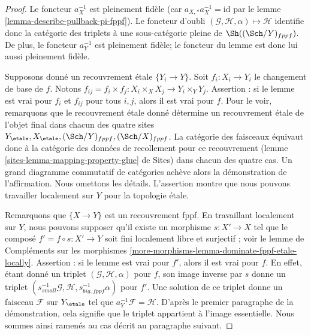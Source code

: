 \begin{proof}
Le foncteur $a_X^{-1}$ est pleinement fidèle (car $a_{X, *}a_X^{-1} = \text{id}$ par le
lemme \ref{lemma-describe-pullback-pi-fppf}). Le foncteur d'oubli
$(\mathcal{G}, \mathcal{H}, \alpha) \mapsto \mathcal{H}$ identifie donc la
catégorie des triplets à une sous-catégorie pleine de $\Sh((\Sch/Y)_{fppf})$.
De plus, le foncteur $a_Y^{-1}$ est pleinement fidèle; le foncteur
du lemme est donc lui aussi pleinement fidèle.

\medskip\noindent
Supposons donné un recouvrement étale $\{Y_i \to Y\}$.
Soit $f_i : X_i \to Y_i$ le changement de base de $f$.
Notons $f_{ij} = f_i \times f_j : X_i \times_X X_j  \to Y_i \times_Y Y_j$.
Assertion : si le lemme est vrai pour $f_i$ et $f_{ij}$ pour tous $i, j$, alors
il est vrai pour $f$. Pour le voir, remarquons que le recouvrement étale donné
détermine un recouvrement étale de l'objet final dans chacun des
quatre sites $Y_\etale, X_\etale, (\Sch/Y)_{fppf}, (\Sch/X)_{fppf}$.
La catégorie des faisceaux équivaut donc à la catégorie des données de
recollement pour ce recouvrement
(lemme \ref{sites-lemma-mapping-property-glue} de Sites)
dans chacun des quatre cas. Un grand diagramme commutatif de
catégories achève alors la démonstration de l'affirmation. Nous omettons les détails.
L'assertion montre que nous pouvons travailler localement sur $Y$ pour la topologie étale.

\medskip\noindent
Remarquons que $\{X \to Y\}$ est un recouvrement fppf. En travaillant localement sur $Y$,
nous pouvons supposer qu'il existe un morphisme $s : X' \to X$
tel que le composé $f' = f \circ s : X' \to Y$ soit fini localement libre et surjectif ; voir le
lemme de Compléments sur les morphismes
\ref{more-morphisms-lemma-dominate-fppf-etale-locally}.
Assertion : si le lemme est vrai pour $f'$, alors il est vrai pour $f$.
En effet, étant donné un triplet $(\mathcal{G}, \mathcal{H}, \alpha)$
pour $f$, son image inverse par $s$ donne un triplet
$(s_{small}^{-1}\mathcal{G}, \mathcal{H}, s_{big, fppf}^{-1}\alpha)$
pour $f'$. Une solution de ce triplet donne un faisceau
$\mathcal{F}$ sur $Y_\etale$ tel que $a_Y^{-1}\mathcal{F} = \mathcal{H}$.
D'après le premier paragraphe de la démonstration, cela signifie que le triplet
appartient à l'image essentielle. Nous sommes ainsi ramenés
au cas décrit au paragraphe suivant.


\end{proof}
